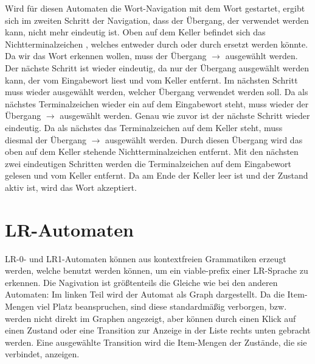 Wird für diesen Automaten die Wort-Navigation mit dem Wort 
ge\-star\-tet, ergibt sich im zweiten Schritt der Navigation, dass der Übergang,
der verwendet werden kann, nicht mehr eindeutig ist. Oben auf dem Keller befindet
sich das Nichtterminalzeichen , welches entweder durch
\TerminalSymbol{$\epsilon$} oder durch
 ersetzt werden könnte. Da wir
das Wort  erkennen wollen, muss der Übergang  $\to$
 ausgewählt werden. Der
nächste Schritt ist wieder eindeutig, da nur der Übergang ausgewählt werden kann,
der  vom Eingabewort liest und  vom Keller
entfernt. Im nächsten Schritt muss wieder ausgewählt werden, welcher Übergang
verwendet werden soll. Da als nächstes Terminalzeichen wieder ein
 auf dem Eingabewort steht, muss wieder der Übergang 
$\to$  ausgewählt werden.
Genau wie zuvor ist der nächste Schritt wieder eindeutig. Da als nächstes das
Terminalzeichen  auf dem Keller steht, muss diesmal der
Übergang  $\to$ \TerminalSymbol{$\epsilon$} ausgewählt werden.
Durch diesen Übergang wird das oben auf dem Keller stehende Nichtterminalzeichen
 entfernt. Mit den nächsten zwei eindeutigen Schritten werden die
Terminalzeichen  auf dem Eingabewort gelesen und vom Keller
entfernt. Da am Ende der Keller leer ist und der Zustand  aktiv ist,
wird das Wort akzeptiert.

\section{LR-Automaten}
LR-0- und LR1-Automaten können aus kontextfreien Grammatiken erzeugt werden,
welche benutzt werden können, um ein viable-prefix einer LR-Sprache zu erkennen.
Die Nagivation ist größtenteils die Gleiche wie bei den anderen Automaten:
Im linken Teil wird der Automat als Graph dargestellt.
Da die Item-Mengen viel Platz beanspruchen, sind diese standardmäßig verborgen,
bzw. werden nicht direkt im Graphen angezeigt,
aber können durch einen Klick auf einen Zustand oder eine Transition zur Anzeige
in der Liste rechts unten gebracht werden. Eine ausgewählte Transition wird
die Item-Mengen der Zustände, die sie verbindet, anzeigen.


